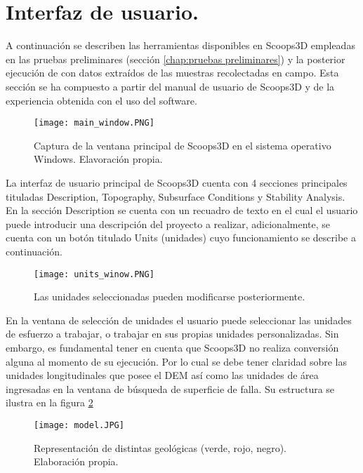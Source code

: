 \section{Interfaz de usuario.}

A continuaci\'on se describen las herramientas disponibles  en Scoops3D empleadas en las pruebas preliminares (secci\'on \ref{chap:pruebas preliminares}) y la posterior ejecuci\'on de con datos extra\'idos de las muestras recolectadas en campo.
Esta secci\'on se ha compuesto a partir del manual de usuario de Scoops3D y de la experiencia obtenida con el uso del software.



\begin{figure}[h]
\centering
\texttt{[image: main\_window.PNG]}
\caption{Captura de la ventana principal de Scoops3D en el sistema operativo Windows. Elavoraci\'on propia.}
\label{fig:Interfaz de usuario}
\end{figure}

La interfaz de usuario principal de Scoops3D  cuenta con 4 secciones principales tituladas Description, Topography, Subsurface Conditions y Stability Analysis. En la secci\'{o}n Description se cuenta con un recuadro de texto en el cual el usuario puede introducir una descripci\'{o}n del proyecto a realizar, adicionalmente, se cuenta con un bot\'{o}n titulado Units (unidades) cuyo funcionamiento se describe a continuaci\'{o}n. \\

\begin{figure}[H]
\centering
\texttt{[image: units\_winow.PNG]}
\caption{Las unidades seleccionadas pueden modificarse posteriormente.}
\label{unidades}
\end{figure}


En la ventana de selecci\'{o}n de unidades el usuario puede seleccionar las unidades de
esfuerzo a trabajar, o trabajar en sus propias unidades personalizadas. Sin embargo, es
fundamental tener en cuenta que Scoops3D no realiza conversi\'{o}n alguna al momento de su
ejecuci\'{o}n. Por lo cual se debe tener claridad sobre las unidades longitudinales que posee el
DEM as\'{i} como las unidades de \'{a}rea ingresadas en la ventana de b\'{u}squeda de superficie de
falla. Su estructura se ilustra en la figura \ref{unidades}
\\
\begin{figure}[h]
\centering
\texttt{[image: model.JPG]}
\caption{Representaci\'on de distintas geol\'ogicas (verde, rojo, negro). Elaboraci\'on propia.}
\label{geo-units}
\end{figure}


